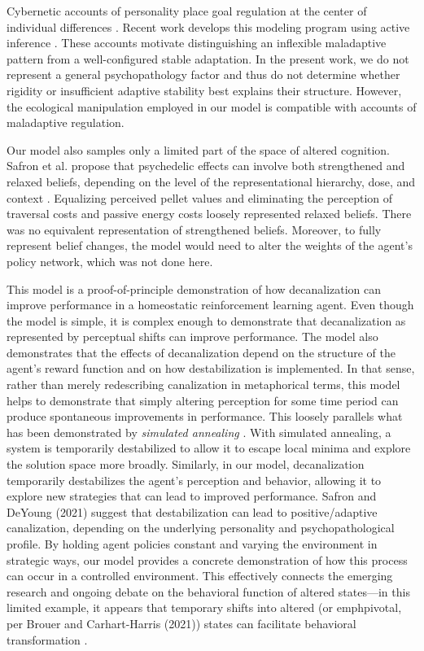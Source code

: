 \documentclass[12pt,fleqn]{article}
\begin{document}
Cybernetic accounts of personality place goal regulation at the center of individual differences \cite{safron_deyoung_2021}. Recent work develops this modeling program using active inference \cite{safron_sheikhbahaee_2024}. These accounts motivate distinguishing an inflexible maladaptive pattern from a well-configured stable adaptation. In the present work, we do not represent a general psychopathology factor and thus do not determine whether rigidity or insufficient adaptive stability best explains their structure. However, the ecological manipulation employed in our model is compatible with accounts of maladaptive regulation.

Our model also samples only a limited part of the space of altered cognition. Safron et al. propose that psychedelic effects can involve both strengthened and relaxed beliefs, depending on the level of the representational hierarchy, dose, and context \cite{safron_albus_2025}. Equalizing perceived pellet values and eliminating the perception of traversal costs and passive energy costs loosely represented relaxed beliefs. There was no equivalent representation of strengthened beliefs. Moreover, to fully represent belief changes, the model would need to alter the weights of the agent's policy network, which was not done here.

This model is a proof-of-principle demonstration of how decanalization can improve performance in a homeostatic reinforcement learning agent. Even though the model is simple, it is complex enough to demonstrate that decanalization as represented by perceptual shifts can improve performance. The model also demonstrates that the effects of decanalization depend on the structure of the agent's reward function and on how destabilization is implemented. In that sense, rather than merely redescribing canalization in metaphorical terms, this model helps to demonstrate that simply altering perception for some time period can produce spontaneous improvements in performance. This loosely parallels what has been demonstrated by \emph{simulated annealing} \cite{kirkpatrick_optimization_1983, hajek_cooling_1988}. With simulated annealing, a system is temporarily destabilized to allow it to escape local minima and explore the solution space more broadly. Similarly, in our model, decanalization temporarily destabilizes the agent's perception and behavior, allowing it to explore new strategies that can lead to improved performance. Safron and DeYoung (2021) suggest that destabilization can lead to positive/adaptive canalization, depending on the underlying personality and psychopathological profile. By holding agent policies constant and varying the environment in strategic ways, our model provides a concrete demonstration of how this process can occur in a controlled environment. This effectively connects the emerging research and ongoing debate on the behavioral function of altered states---in this limited example, it appears that temporary shifts into altered (or emph{pivotal}, per Brouer and Carhart-Harris (2021)) states can facilitate behavioral transformation \cite{clingoDisintegrationReintegrationModelPsychological2025}.
\end{document}
